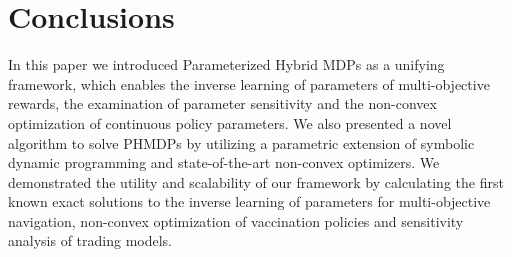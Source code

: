 \section{Conclusions}
\label{sec:conclusion}

In this paper we introduced Parameterized Hybrid MDPs as a unifying framework, which enables the inverse learning of parameters of multi-objective rewards, the examination of parameter sensitivity and the non-convex optimization of continuous policy parameters. We also presented a novel algorithm to solve PHMDPs by utilizing a parametric extension of symbolic dynamic programming and state-of-the-art non-convex optimizers. We demonstrated the utility and scalability of our framework by calculating the first known exact solutions to the inverse learning of parameters for multi-objective navigation, non-convex optimization of vaccination policies and sensitivity analysis of trading models.
%
